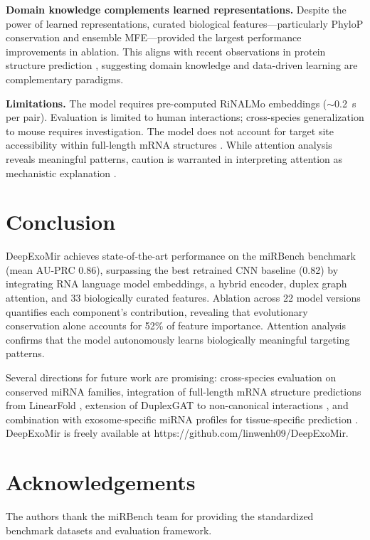 \documentclass[unnumsec,webpdf,contemporary,large]{oup-authoring-template}
\begin{document}
\textbf{Domain knowledge complements learned representations.} Despite the power of learned representations, curated biological features---particularly PhyloP conservation \citep{pollard2010} and ensemble MFE---provided the largest performance improvements in ablation. This aligns with recent observations in protein structure prediction \citep{jumper2021}, suggesting domain knowledge and data-driven learning are complementary paradigms.

\textbf{Limitations.} The model requires pre-computed RiNALMo embeddings ($\sim$0.2~s per pair). Evaluation is limited to human interactions; cross-species generalization to mouse \citep{betel2010} requires investigation. The model does not account for target site accessibility within full-length mRNA structures \citep{kertesz2007,lorenz2011}. While attention analysis reveals meaningful patterns, caution is warranted in interpreting attention as mechanistic explanation \citep{jain2019}.

\section{Conclusion}

DeepExoMir achieves state-of-the-art performance on the miRBench benchmark (mean AU-PRC 0.86), surpassing the best retrained CNN baseline (0.82) by integrating RNA language model embeddings, a hybrid encoder, duplex graph attention, and 33 biologically curated features. Ablation across 22 model versions quantifies each component's contribution, revealing that evolutionary conservation alone accounts for 52\% of feature importance. Attention analysis confirms that the model autonomously learns biologically meaningful targeting patterns.

Several directions for future work are promising: cross-species evaluation on conserved miRNA families, integration of full-length mRNA structure predictions from LinearFold \citep{huang2019}, extension of DuplexGAT to non-canonical interactions \citep{shin2010}, and combination with exosome-specific miRNA profiles for tissue-specific prediction \citep{valadi2007,obrien2020}. DeepExoMir is freely available at https://github.com/linwenh09/DeepExoMir.

\section*{Acknowledgements}

The authors thank the miRBench team for providing the standardized benchmark datasets and evaluation framework.
\end{document}
